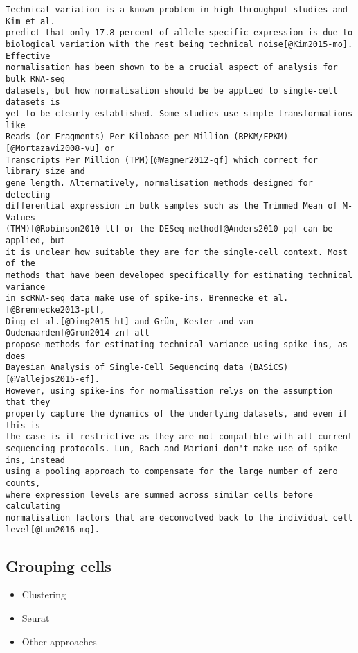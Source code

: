 \documentclass[11pt,a4paper,titlepage,twoside,openright]{style/unimelbthesis}
\theoremstyle{definition}
\theoremstyle{definition}
\theoremstyle{definition}
\theoremstyle{remark}
\begin{document}
\begin{mainmatter}
\begin{verbatim}
Technical variation is a known problem in high-throughput studies and Kim et al.
predict that only 17.8 percent of allele-specific expression is due to
biological variation with the rest being technical noise[@Kim2015-mo]. Effective
normalisation has been shown to be a crucial aspect of analysis for bulk RNA-seq
datasets, but how normalisation should be be applied to single-cell datasets is
yet to be clearly established. Some studies use simple transformations like
Reads (or Fragments) Per Kilobase per Million (RPKM/FPKM)[@Mortazavi2008-vu] or
Transcripts Per Million (TPM)[@Wagner2012-qf] which correct for library size and
gene length. Alternatively, normalisation methods designed for detecting
differential expression in bulk samples such as the Trimmed Mean of M-Values
(TMM)[@Robinson2010-ll] or the DESeq method[@Anders2010-pq] can be applied, but
it is unclear how suitable they are for the single-cell context. Most of the
methods that have been developed specifically for estimating technical variance
in scRNA-seq data make use of spike-ins. Brennecke et al.[@Brennecke2013-pt],
Ding et al.[@Ding2015-ht] and Grün, Kester and van Oudenaarden[@Grun2014-zn] all
propose methods for estimating technical variance using spike-ins, as does
Bayesian Analysis of Single-Cell Sequencing data (BASiCS)[@Vallejos2015-ef].
However, using spike-ins for normalisation relys on the assumption that they
properly capture the dynamics of the underlying datasets, and even if this is
the case is it restrictive as they are not compatible with all current
sequencing protocols. Lun, Bach and Marioni don't make use of spike-ins, instead
using a pooling approach to compensate for the large number of zero counts,
where expression levels are summed across similar cells before calculating
normalisation factors that are deconvolved back to the individual cell
level[@Lun2016-mq].
\end{verbatim}

\hypertarget{grouping-cells}{%
\subsection{Grouping cells}\label{grouping-cells}}

\begin{itemize}
\tightlist
\item
  Clustering
\item
  Seurat
\item
  Other approaches
\end{itemize}


\end{mainmatter}
\end{document}
